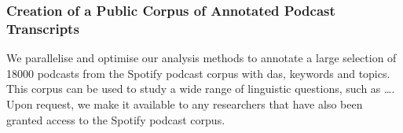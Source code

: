 \subsubsection{Creation of a Public Corpus of Annotated Podcast Transcripts}
    We parallelise and optimise our analysis methods to annotate a large selection of 18000 podcasts from the Spotify podcast corpus\cite{clifton-2020100000} with \glspl{da}, keywords and topics. This corpus can be used to study a wide range of linguistic questions, such as \dots. Upon request, we make it available to any researchers that have also been granted access to the Spotify podcast corpus.
\glsresetall

\newpage
